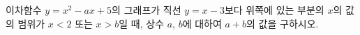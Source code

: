 이차함수 $y=x^2-ax+5$의 그래프가 직선 $y=x-3$보다 위쪽에 있는 부분의 $x$의 값의 범위가 $x<2$ 또는 $x>b$일 때, 상수 $a$, $b$에 대하여 $a+b$의 값을 구하시오. 
